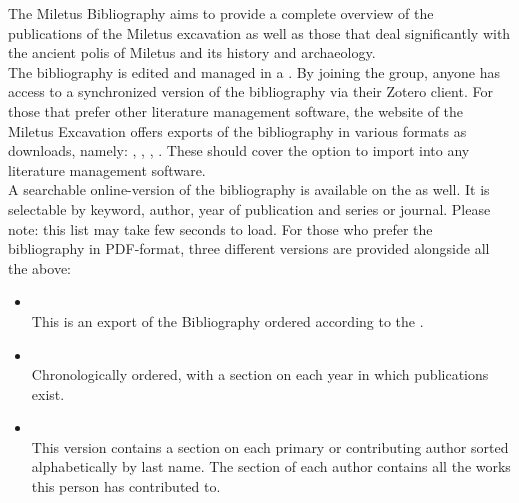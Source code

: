 \documentclass[a4paper]{scrartcl}
\newcommand{\redhref}[2]{\href{#1}{\color{uhhred}{#2}}}
\begin{document}


The Miletus Bibliography aims to provide a complete overview of the publications of the Miletus excavation as well as those that deal significantly with the ancient polis of Miletus and its history and archaeology.\\

The bibliography is edited and managed in a \redhref{https://www.zotero.org/groups/4475959/milet_bibliography}{publicly accessible Zotero group library}. By joining the group, anyone has access to a synchronized version of the bibliography via their Zotero client. For those that prefer other literature management software, the website of the Miletus Excavation offers exports of the bibliography in various formats as downloads, namely: \redhref{https://raw.github.com/Miletus-Excavation/Miletus_Bibliography/main/data/Milet_Bibliography_BibLaTeX.bib}{BibLaTeX}, \redhref{https://raw.github.com/Miletus-Excavation/Miletus_Bibliography/main/data/Milet_Bibliography_BibTeX.bib}{BibTeX}, \redhref{https://raw.github.com/Miletus-Excavation/Miletus_Bibliography/main/data/Milet_Bibliography_CSV.csv}{CSV}, \redhref{https://raw.github.com/Miletus-Excavation/Miletus_Bibliography/main/data/Milet_Bibliography_RIS.ris}{RIS}. These should cover the option to import into any literature management software.\\

A searchable online-version of the bibliography is available on the \redhref{https://www.miletgrabung.uni-hamburg.de/material/bibliographie.html}{homepage of the Miletus Excavation} as well. It is selectable by keyword, author, year of publication and series or journal. Please note: this list may take few seconds to load. For those who prefer the bibliography in PDF-format, three different versions are provided alongside all the above: 

\begin{itemize}
    \item \redhref{https://raw.github.com/Miletus-Excavation/Miletus_Bibliography/main/out/pdf/milet-bibliographie-by-tag-pdf.pdf}{Milet-Bibliographie, by keyword (PDF)}\\
    This is an export of the Bibliography ordered according to the \redhref{https://www.miletgrabung.uni-hamburg.de/en/material/bibliographie/bib-tags.html}{System of Keywords}.
    \item \redhref{https://raw.github.com/Miletus-Excavation/Miletus_Bibliography/main/out/pdf/milet-bibliographie-by-year-pdf.pdf}{Milet-Bibliographie, chronological (PDF)}\\
    Chronologically ordered, with a section on each year in which publications exist. 
    \item \redhref{https://raw.github.com/Miletus-Excavation/Miletus_Bibliography/main/out/pdf/milet-bibliographie-by-author-pdf.pdf}{Milet-Bibliographie, by author (PDF)}\\
    This version contains a section on each primary or contributing author sorted alphabetically by last name. The section of each author contains all the works this person has contributed to. 
\end{itemize}
\end{document}
